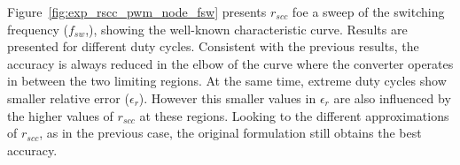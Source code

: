 Figure~\ref{fig:exp_rscc_pwm_node_fsw} presents $r_{scc}$ foe a sweep of the switching frequency ($f_{sw}$,), showing the well-known characteristic curve. Results are presented  for different duty cycles. Consistent with the previous results, the accuracy is always reduced in the elbow of the curve where the converter operates in between the two limiting regions. At the same time, extreme duty cycles show smaller relative error ($\epsilon_r$). However this smaller values in $\epsilon_r$ are also influenced by the higher values of $r_{scc}$ at these regions.  Looking to the different approximations of $r_{scc}$, as in the previous case, the original formulation still obtains the best accuracy.

